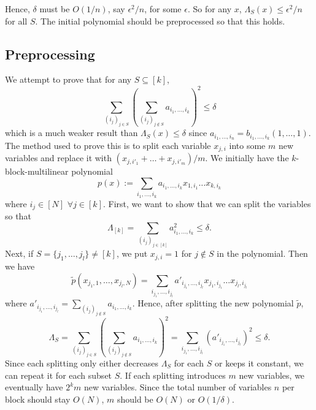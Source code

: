 \documentclass[12pt]{report}
\begin{document}
Hence, $\delta$ must be $O(1/n)$, say $\epsilon^2/n$, for some $\epsilon$. So for any $x$, $\Lambda_S(x) \leq \epsilon^2/n$ for all $S$. The initial polynomial should be preprocessed so that this holds.

\subsection{Preprocessing}
We attempt to prove that for any $S \subseteq [k]$,
$$
\sum_{(i_j)_{j \in S}} \left(\sum_{(i_j)_{j \notin S}} a_{i_1, \ldots, i_k}\right)^2 \leq \delta
$$
which is a much weaker result than $\Lambda_S(x) \leq \delta$ since $a_{i_1, \ldots, i_ n} = b_{i_1, \ldots, i_k}(1, \ldots, 1)$. The method used to prove this is to split each variable $x_{j,i}$ into some $m$ new variables and replace it with $(x_{j,i'_1} + \ldots + x_{j,i'_m})/m$. We initially have the $k$-block-multilinear polynomial
\begin{equation}
p(x) := \sum_{i_1, \ldots, i_k} a_{i_1, \ldots, i_k} x_{1,i_1} \ldots x_{k,i_k}
\end{equation}
where $i_j \in [N]$ $\forall j \in [k]$. First, we want to show that we can split the variables so that
$$
\Lambda_{[k]} = \sum_{(i_j)_{j \in [k]}} a_{i_1, \ldots, i_k}^2 \leq \delta.
$$
Next, if $S = \{j_1, \ldots, j_l\} \neq [k]$, we put $x_{j,i} = 1$ for $j \notin S$ in the polynomial. Then we have
$$
\tilde{p}(x_{j_1,1}, \ldots, x_{j_l,N}) = \sum_{i_{j_1}, \ldots, i_{j_l}} a'_{i_{j_1}, \ldots, i_{j_l}} x_{j_1,i_{j_1}} \ldots x_{j_l,i_{j_l}}
$$
where $a'_{i_{j_1}, \ldots, i_{j_l}} = \sum_{(i_j)_{j \notin S}} a_{i_1, \ldots, i_k}$. Hence, after splitting the new polynomial $\tilde{p}$,
$$
\Lambda_S = \sum_{(i_j)_{j \in S}} \left(\sum_{(i_j)_{j \notin S}} a_{i_1, \ldots, i_k}\right)^2 = \sum_{i_{j_1}, \ldots, i_{j_l}} (a'_{i_{j_1}, \ldots, i_{j_l}})^2 \leq \delta.
$$
Since each splitting only either decreases $\Lambda_S$ for each $S$ or keeps it constant, we can repeat it for each subset $S$. If each splitting introduces $m$ new variables, we eventually have $2^k m$ new variables. Since the total number of variables $n$ per block should stay $O(N)$, $m$ should be $O(N)$ or $O(1/\delta)$.
\end{document}
